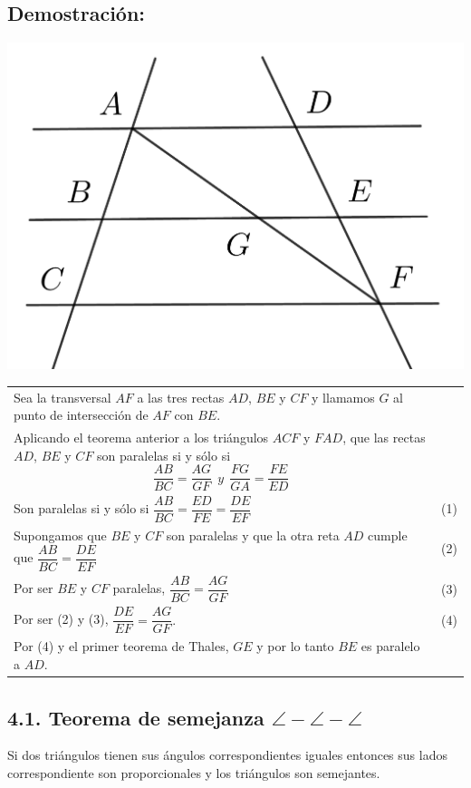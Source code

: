\documentclass[12pt,a4paper]{article}
\begin{document}
\subsection*{Demostración:}
\begin{center}
\includegraphics[scale=0.6]{thales2.png} 
\end{center}
\begin{tabular}{p{15.9cm} p{1cm}}
Sea la transversal $AF$ a las tres rectas $AD$, $BE$ y $CF$ y llamamos $G$ al punto de intersección de $AF$ con $BE$.
\\Aplicando el teorema anterior a los triángulos $ACF$ y $FAD$, que las rectas $AD$, $BE$ y $CF$ son paralelas si y sólo si
$$\dfrac{AB}{BC}=\dfrac{AG}{GF} \> \>  y \> \> \dfrac{FG}{GA}=\dfrac{FE}{ED}$$
\\Son paralelas si y sólo si $\dfrac{AB}{BC}=\dfrac{ED}{FE}=\dfrac{DE}{EF}$ & (1)
\\Supongamos que $BE$ y $CF$ son paralelas y que la otra reta $AD$ cumple que $\dfrac{AB}{BC}=\dfrac{DE}{EF}$ &(2)
\\ Por ser $BE$ y $CF$ paralelas, $\dfrac{AB}{BC}=\dfrac{AG}{GF}$&(3)
\\Por ser (2) y (3), $\dfrac{DE}{EF}=\dfrac{AG}{GF}.$ & (4)
\\Por (4) y el primer teorema de Thales, $GE$ y por lo tanto $BE$ es paralelo a $AD$. 
\end{tabular}
\subsection*{4.1. Teorema de semejanza $\angle - \angle - \angle$}
Si dos triángulos tienen sus ángulos correspondientes iguales entonces sus lados correspondiente son proporcionales y los triángulos son semejantes.
\end{document}
